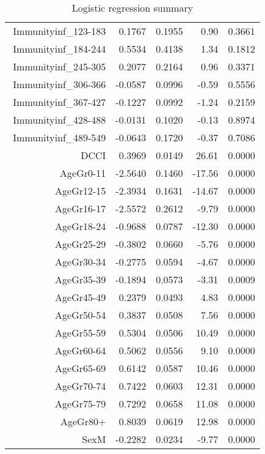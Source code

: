 \begin{table}[ht]
\begin{tabular}{rrrrr}
$$  Immunityinf\_123-183 & 0.1767 & 0.1955 & 0.90 & 0.3661 \\ 
  Immunityinf\_184-244 & 0.5534 & 0.4138 & 1.34 & 0.1812 \\ 
  Immunityinf\_245-305 & 0.2077 & 0.2164 & 0.96 & 0.3371 \\ 
  Immunityinf\_306-366 & -0.0587 & 0.0996 & -0.59 & 0.5556 \\ 
  Immunityinf\_367-427 & -0.1227 & 0.0992 & -1.24 & 0.2159 \\ 
  Immunityinf\_428-488 & -0.0131 & 0.1020 & -0.13 & 0.8974 \\ 
  Immunityinf\_489-549 & -0.0643 & 0.1720 & -0.37 & 0.7086 \\ 
  DCCI & 0.3969 & 0.0149 & 26.61 & 0.0000 \\ 
  AgeGr0-11 & -2.5640 & 0.1460 & -17.56 & 0.0000 \\ 
  AgeGr12-15 & -2.3934 & 0.1631 & -14.67 & 0.0000 \\ 
  AgeGr16-17 & -2.5572 & 0.2612 & -9.79 & 0.0000 \\ 
  AgeGr18-24 & -0.9688 & 0.0787 & -12.30 & 0.0000 \\ 
  AgeGr25-29 & -0.3802 & 0.0660 & -5.76 & 0.0000 \\ 
  AgeGr30-34 & -0.2775 & 0.0594 & -4.67 & 0.0000 \\ 
  AgeGr35-39 & -0.1894 & 0.0573 & -3.31 & 0.0009 \\ 
  AgeGr45-49 & 0.2379 & 0.0493 & 4.83 & 0.0000 \\ 
  AgeGr50-54 & 0.3837 & 0.0508 & 7.56 & 0.0000 \\ 
  AgeGr55-59 & 0.5304 & 0.0506 & 10.49 & 0.0000 \\ 
  AgeGr60-64 & 0.5062 & 0.0556 & 9.10 & 0.0000 \\ 
  AgeGr65-69 & 0.6142 & 0.0587 & 10.46 & 0.0000 \\ 
  AgeGr70-74 & 0.7422 & 0.0603 & 12.31 & 0.0000 \\ 
  AgeGr75-79 & 0.7292 & 0.0658 & 11.08 & 0.0000 \\ 
  AgeGr80+ & 0.8039 & 0.0619 & 12.98 & 0.0000 \\ 
  SexM & -0.2282 & 0.0234 & -9.77 & 0.0000 \\ 
   \hline
\end{tabular}
\caption{Logistic regression summary} 
\end{table}
